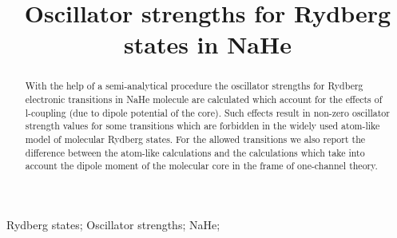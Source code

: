 \documentclass[]{interact}
\theoremstyle{plain}%
\theoremstyle{definition}
\theoremstyle{remark}
\begin{document}

\title{Oscillator strengths for Rydberg states in NaHe}

\author{
}

\maketitle

\begin{abstract}
With the help of a semi-analytical procedure the oscillator strengths for Rydberg electronic transitions in NaHe molecule are calculated which account for the effects of l-coupling (due to dipole potential of the core). Such effects result in non-zero oscillator strength values for some transitions which are forbidden in the widely used atom-like model of molecular Rydberg states. For the allowed transitions we also report the difference between the atom-like calculations and the calculations which take into account the dipole moment of the molecular core in the frame of one-channel theory.
\end{abstract}

\begin{keywords}
Rydberg states; Oscillator strengths; NaHe;
\end{keywords}
\end{document}

